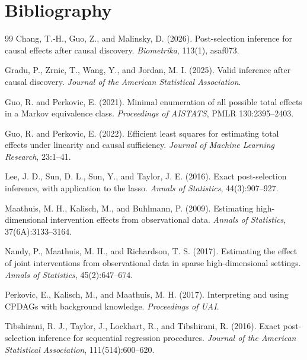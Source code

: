 \documentclass[11pt]{article}
\theoremstyle{definition}
\theoremstyle{plain}
\theoremstyle{remark}
\begin{document}
\section*{Bibliography}
\begin{thebibliography}{99}
Chang, T.-H., Guo, Z., and Malinsky, D. (2026).
Post-selection inference for causal effects after causal discovery.
\emph{Biometrika}, 113(1), asaf073.

Gradu, P., Zrnic, T., Wang, Y., and Jordan, M. I. (2025).
Valid inference after causal discovery.
\emph{Journal of the American Statistical Association}.

Guo, R. and Perkovic, E. (2021).
Minimal enumeration of all possible total effects in a Markov equivalence class.
\emph{Proceedings of AISTATS}, PMLR 130:2395--2403.

Guo, R. and Perkovic, E. (2022).
Efficient least squares for estimating total effects under linearity and causal sufficiency.
\emph{Journal of Machine Learning Research}, 23:1--41.

Lee, J. D., Sun, D. L., Sun, Y., and Taylor, J. E. (2016).
Exact post-selection inference, with application to the lasso.
\emph{Annals of Statistics}, 44(3):907--927.

Maathuis, M. H., Kalisch, M., and Buhlmann, P. (2009).
Estimating high-dimensional intervention effects from observational data.
\emph{Annals of Statistics}, 37(6A):3133--3164.

Nandy, P., Maathuis, M. H., and Richardson, T. S. (2017).
Estimating the effect of joint interventions from observational data in sparse high-dimensional settings.
\emph{Annals of Statistics}, 45(2):647--674.

Perkovic, E., Kalisch, M., and Maathuis, M. H. (2017).
Interpreting and using CPDAGs with background knowledge.
\emph{Proceedings of UAI}.

Tibshirani, R. J., Taylor, J., Lockhart, R., and Tibshirani, R. (2016).
Exact post-selection inference for sequential regression procedures.
\emph{Journal of the American Statistical Association}, 111(514):600--620.
\end{thebibliography}
\end{document}
